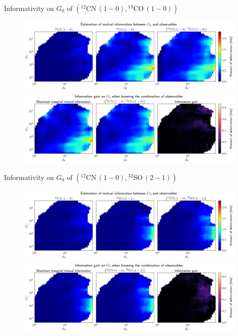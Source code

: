 \documentclass{beamer}
\begin{document}
\begin{frame}{Informativity on $G_0$ of $\left(\mathrm{^{12}CN\,(1-0)},\mathrm{^{13}CO\,(1-0)}\right)$}
    \begin{figure}
        \centering
        \includegraphics[width=0.95\linewidth]{../mi/g0__12cn10_13co10_mi.png}
        \vfill
        \includegraphics[width=0.95\linewidth]{../mi/g0__12cn10_13co10_mi_gain.png}
    \end{figure}
\end{frame}

\begin{frame}{Informativity on $G_0$ of $\left(\mathrm{^{12}CN\,(1-0)},\mathrm{^{32}SO\,(2-1)}\right)$}
    \begin{figure}
        \centering
        \includegraphics[width=0.95\linewidth]{../mi/g0__12cn10_32so21_mi.png}
        \vfill
        \includegraphics[width=0.95\linewidth]{../mi/g0__12cn10_32so21_mi_gain.png}
    \end{figure}
\end{frame}
\end{document}
